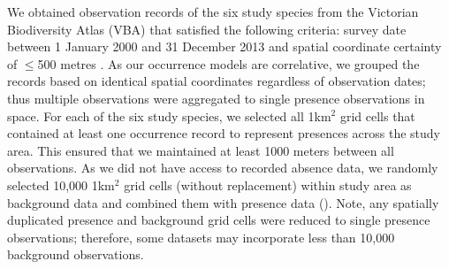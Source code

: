 We obtained observation records of the six study species from the Victorian Biodiversity Atlas (VBA) that satisfied the following criteria: survey date between 1 January 2000 and 31 December 2013 and spatial coordinate certainty of $\leq$500 metres \citep{depi16}.  As our occurrence models are correlative, we grouped the records based on identical spatial coordinates regardless of observation dates; thus multiple observations were aggregated to single presence observations in space. For each of the six study species, we selected all 1km$^2$ grid cells that contained at least one occurrence record to represent presences across the study area. This ensured that we maintained at least 1000 meters between all observations. As we did not have access to recorded absence data, we randomly selected 10,000 1km$^2$ grid cells (without replacement) within study area as background data and combined them with presence data (). Note, any spatially duplicated presence and background grid cells were reduced to single presence observations; therefore, some datasets may incorporate less than 10,000 background observations.

